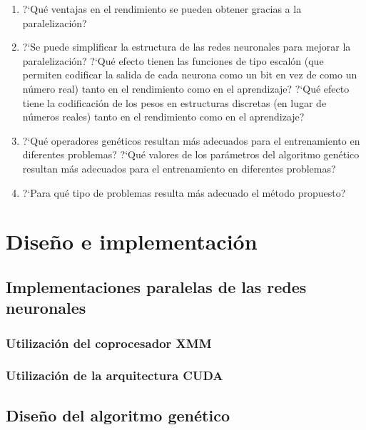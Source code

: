 \documentclass[11pt]{article}
\begin{document}
\begin{titlepage}
\begin{enumerate}
 
 \item  ?`Qu\'e ventajas en el rendimiento se pueden obtener gracias a la paralelizaci\'on?

 \item  ?`Se puede simplificar la estructura de las redes neuronales para mejorar la paralelizaci\'on? ?`Qu\'e efecto tienen las funciones de tipo escal\'on (que permiten codificar la salida de cada neurona como un bit en vez de como un n\'umero real) tanto en el rendimiento como en el aprendizaje? ?`Qu\'e efecto tiene la codificaci\'on de los pesos en estructuras discretas (en lugar de n\'umeros reales) tanto en el rendimiento como en el aprendizaje?

 \item  ?`Qu\'e operadores gen\'eticos resultan m\'as adecuados para el entrenamiento en diferentes problemas? ?`Qu\'e valores de los par\'ametros del algoritmo gen\'etico resultan m\'as adecuados para el entrenamiento en diferentes problemas?

 \item  ?`Para qu\'e tipo de problemas resulta m\'as adecuado el m\'etodo propuesto? 

\end{enumerate}

\newpage
\section{Dise\~no e implementaci\'on}
\label{sec-4}

  \label{diseno}
\subsection{Implementaciones paralelas de las redes neuronales}
\label{sec-4-1}

  \label{disenoParal}
\subsubsection{Utilizaci\'on del coprocesador XMM}
\label{sec-4-1-1}

  \label{disenoParalXMM}
\subsubsection{Utilizaci\'on de la arquitectura CUDA}
\label{sec-4-1-2}

  \label{disenoParalCUDA}
\subsection{Dise\~no del algoritmo gen\'etico}
\label{sec-4-2}


\end{titlepage}
\end{document}

